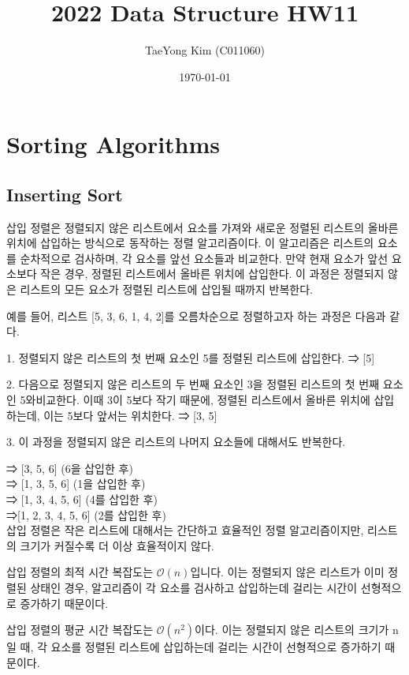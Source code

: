 \documentclass{article}
\title{2022 Data Structure HW11}
\author{TaeYong Kim (C011060)}
\date{\today}
\begin{document}
\maketitle

\section{Sorting Algorithms}

\subsection{Inserting Sort}
삽입 정렬은 정렬되지 않은 리스트에서 요소를 가져와 새로운 정렬된 리스트의 올바른 위치에 삽입하는 방식으로 동작하는 정렬 알고리즘이다. 이 알고리즘은 리스트의 요소를 순차적으로 검사하며, 각 요소를 앞선 요소들과 비교한다. 만약 현재 요소가 앞선 요소보다 작은 경우, 정렬된 리스트에서 올바른 위치에 삽입한다. 이 과정은 정렬되지 않은 리스트의 모든 요소가 정렬된 리스트에 삽입될 때까지 반복한다.

예를 들어, 리스트 [5, 3, 6, 1, 4, 2]를 오름차순으로 정렬하고자 하는 과정은 다음과 같다.

    1. 정렬되지 않은 리스트의 첫 번째 요소인 5를 정렬된 리스트에 삽입한다. ⇒ [5]

    2. 다음으로 정렬되지 않은 리스트의 두 번째 요소인 3을 정렬된 리스트의 첫 번째 요소인 5와비교한다. 이때 3이 5보다 작기 때문에, 정렬된 리스트에서 올바른 위치에 삽입하는데, 이는 5보다 앞서는 위치한다. ⇒ [3, 5]

    3. 이 과정을 정렬되지 않은 리스트의 나머지 요소들에 대해서도 반복한다. 

    ⇒ [3, 5, 6] (6을 삽입한 후) \\
    ⇒ [1, 3, 5, 6] (1을 삽입한 후) \\
    ⇒ [1, 3, 4, 5, 6] (4를 삽입한 후) \\
    ⇒[1, 2, 3, 4, 5, 6] (2를 삽입한 후) \\

삽입 정렬은 작은 리스트에 대해서는 간단하고 효율적인 정렬 알고리즘이지만, 리스트의 크기가 커질수록 더 이상 효율적이지 않다.

삽입 정렬의 최적 시간 복잡도는 $\mathcal{O}(n)$입니다. 이는 정렬되지 않은 리스트가 이미 정렬된 상태인 경우, 알고리즘이 각 요소를 검사하고 삽입하는데 걸리는 시간이 선형적으로 증가하기 때문이다.

삽입 정렬의 평균 시간 복잡도는 $\mathcal{O}(n^2)$이다. 이는 정렬되지 않은 리스트의 크기가 n일 때, 각 요소를 정렬된 리스트에 삽입하는데 걸리는 시간이 선형적으로 증가하기 때문이다.
\end{document}
